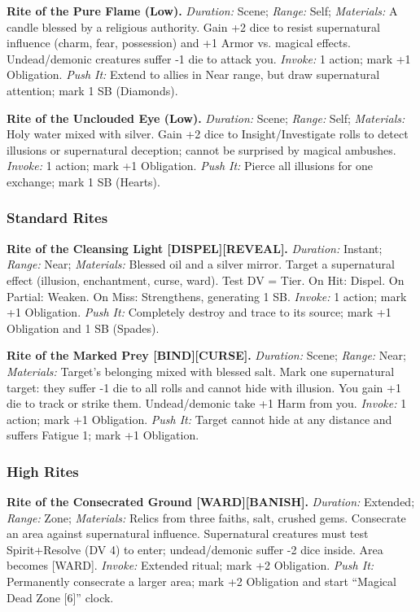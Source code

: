 \documentclass[11pt]{article}
\begin{document}
\textbf{Rite of the Pure Flame (Low).}
\emph{Duration:} Scene; \emph{Range:} Self; \emph{Materials:} A candle blessed by a religious authority.
Gain +2 dice to resist supernatural influence (charm, fear, possession) and +1 Armor vs. magical effects. Undead/demonic creatures suffer -1 die to attack you.
\emph{Invoke:} 1 action; mark +1 Obligation.
\emph{Push It:} Extend to allies in Near range, but draw supernatural attention; mark 1 SB (Diamonds).

\textbf{Rite of the Unclouded Eye (Low).}
\emph{Duration:} Scene; \emph{Range:} Self; \emph{Materials:} Holy water mixed with silver.
Gain +2 dice to Insight/Investigate rolls to detect illusions or supernatural deception; cannot be surprised by magical ambushes.
\emph{Invoke:} 1 action; mark +1 Obligation.
\emph{Push It:} Pierce all illusions for one exchange; mark 1 SB (Hearts).

\subsubsection*{Standard Rites}

\textbf{Rite of the Cleansing Light [DISPEL][REVEAL].}
\emph{Duration:} Instant; \emph{Range:} Near; \emph{Materials:} Blessed oil and a silver mirror.
Target a supernatural effect (illusion, enchantment, curse, ward). Test DV = Tier. On Hit: Dispel. On Partial: Weaken. On Miss: Strengthens, generating 1 SB.
\emph{Invoke:} 1 action; mark +1 Obligation.
\emph{Push It:} Completely destroy and trace to its source; mark +1 Obligation and 1 SB (Spades).

\textbf{Rite of the Marked Prey [BIND][CURSE].}
\emph{Duration:} Scene; \emph{Range:} Near; \emph{Materials:} Target’s belonging mixed with blessed salt.
Mark one supernatural target: they suffer -1 die to all rolls and cannot hide with illusion. You gain +1 die to track or strike them. Undead/demonic take +1 Harm from you.
\emph{Invoke:} 1 action; mark +1 Obligation.
\emph{Push It:} Target cannot hide at any distance and suffers Fatigue 1; mark +1 Obligation.

\subsubsection*{High Rites}

\textbf{Rite of the Consecrated Ground [WARD][BANISH].}
\emph{Duration:} Extended; \emph{Range:} Zone; \emph{Materials:} Relics from three faiths, salt, crushed gems.
Consecrate an area against supernatural influence. Supernatural creatures must test Spirit+Resolve (DV 4) to enter; undead/demonic suffer -2 dice inside. Area becomes [WARD].
\emph{Invoke:} Extended ritual; mark +2 Obligation.
\emph{Push It:} Permanently consecrate a larger area; mark +2 Obligation and start ``Magical Dead Zone [6]'' clock.
\end{document}
